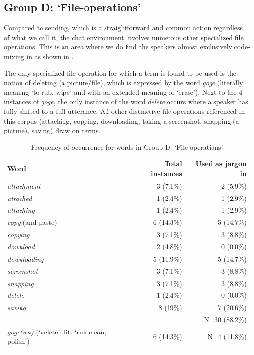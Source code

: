 \documentclass[output=paper,newtxmath,modfonts,nonflat,hidelinks]{langsci/langscibook}
\begin{document}
\subsection{Group D: ‘File-operations’}

Compared to sending, which is a straightforward and common action regardless of what we call it, the chat environment involves numerous other specialized file operations. This is an area where we do find the  speakers almost exclusively code-mixing in  as shown in .  

The only specialized file operation for which a  term is found to be used is the notion of deleting (a picture/file), which is expressed by the word \textit{goge} (literally meaning ‘to rub, wipe’ and with an extended meaning of ‘erase’). Next to the 4 instances of \textit{goge}, the only instance of the  word \textit{delete} occurs where a speaker has fully shifted to a full  utterance. All other distinctive file operations referenced in this corpus (attaching, copying, downloading, taking a screenshot, snapping (a picture), saving) draw on  terms.

\begin{table}
\begin{tabularx}{\textwidth}{Qrr}
\lsptoprule
Word & Total instances & Used as jargon in \\
\midrule
\textit{attachment}       & 3 (7.1\%) & 2 (5.9\%)\\
\textit{attached}         & 1 (2.4\%) & 1 (2.9\%)\\
\textit{attaching}        & 1 (2.4\%) & 1 (2.9\%)\\
\textit{copy} (and paste) & 6 (14.3\%) & 5 (14.7\%)\\
\textit{copying}          & 3 (7.1\%) & 3 (8.8\%)\\
\textit{download}         & 2 (4.8\%) & 0 (0.0\%)\\
\textit{downloading}      & 5 (11.9\%) & 5 (14.7\%)\\
\textit{screenshot}       & 3 (7.1\%) & 3 (8.8\%)\\
\textit{snapping}         & 3 (7.1\%) & 3 (8.8\%)\\
\textit{delete}           & 1 (2.4\%) & 0 (0.0\%)\\
\textit{saving}           & 8 (19\%) & 7 (20.6\%)\\\midrule
& & N=30 (88.2\%)\\\midrule
\textit{goge(wa)} (‘delete’; lit. ‘rub clean, polish’) & 6 (14.3\%) & N=4 (11.8\%)\\
\lspbottomrule
\end{tabularx}
\caption{Frequency of occurrence for words in Group D: ‘File-operations’}
\label{tab:purvis:6}
\end{table} 
\end{document}
